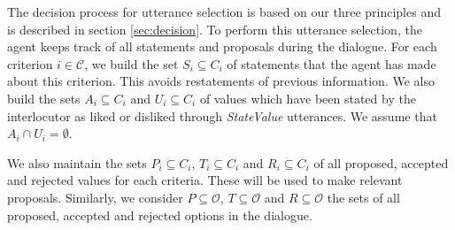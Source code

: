 \documentclass{llncs}
\begin{document}
		\medskip
		The decision process for utterance selection is based on our three principles and is described in section \ref{sec:decision}. To perform this utterance selection, the agent keeps track of all statements and proposals during the dialogue. For each criterion $i\in\mathcal{C}$, we build the set $S_i \subseteq C_i$ of statements that the agent has made about this criterion. This avoids restatements of previous information. We also build the sets $A_i\subseteq C_i$ and $U_i\subseteq C_i$ of values which have been stated by the interlocutor as liked or disliked through \emph{StateValue} utterances. We assume that $A_i\cap U_i=\emptyset$.
		
		We also maintain the sets $P_i \subseteq C_i$, $T_i\subseteq C_i$ and $R_i\subseteq C_i$ of all proposed, accepted and rejected values for each criteria. These will be used to make relevant proposals. Similarly, we consider $P\subseteq \mathcal{O}$, $T\subseteq \mathcal{O}$ and $R\subseteq \mathcal{O}$ the sets of all proposed, accepted and rejected options in the dialogue.
		 
\end{document}
